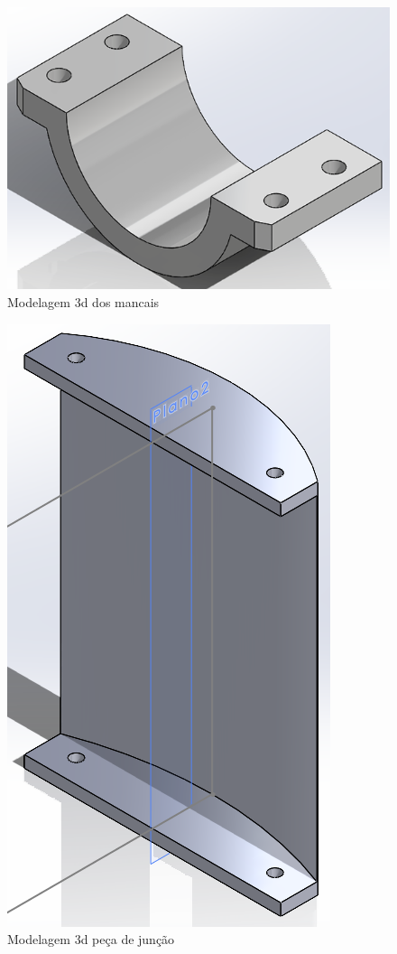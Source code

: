 \begin{figure}[h]
	\centering
	\includegraphics{figures/3d_3}
	\caption{Modelagem 3d dos mancais}
	\label{fig:mancais_3d}
\end{figure}

\begin{figure}[h]
	\centering
	\includegraphics{figures/3d_4}
	\caption{Modelagem 3d peça de junção}
	\label{fig:peca_juncao_3d}
\end{figure}


